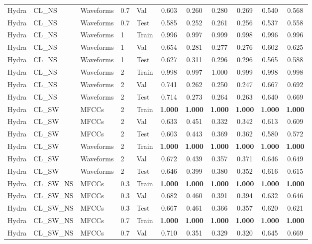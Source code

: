 \begin{landscape}
\begin{longtable}{|l|l|l|l|l|c|c|c|c|c|c|}
Hydra & CL\_NS & Waveforms & 0.7 & Val & 0.603 & 0.260 & 0.280 & 0.269 & 0.540 & 0.568 \\
Hydra & CL\_NS & Waveforms & 0.7 & Test & 0.585 & 0.252 & 0.261 & 0.256 & 0.537 & 0.558 \\
Hydra & CL\_NS & Waveforms & 1 & Train & 0.996 & 0.997 & 0.999 & 0.998 & 0.996 & 0.996 \\
Hydra & CL\_NS & Waveforms & 1 & Val & 0.654 & 0.281 & 0.277 & 0.276 & 0.602 & 0.625 \\
Hydra & CL\_NS & Waveforms & 1 & Test & 0.627 & 0.311 & 0.296 & 0.296 & 0.565 & 0.588 \\
Hydra & CL\_NS & Waveforms & 2 & Train & 0.998 & 0.997 & 1.000 & 0.999 & 0.998 & 0.998 \\
Hydra & CL\_NS & Waveforms & 2 & Val & 0.741 & 0.262 & 0.250 & 0.247 & 0.667 & 0.692 \\
Hydra & CL\_NS & Waveforms & 2 & Test & 0.714 & 0.273 & 0.264 & 0.263 & 0.640 & 0.669 \\
Hydra & CL\_SW & MFCCs & 2 & Train & \textbf{1.000} & \textbf{1.000} & \textbf{1.000} & \textbf{1.000} & \textbf{1.000} & \textbf{1.000} \\
Hydra & CL\_SW & MFCCs & 2 & Val & 0.633 & 0.451 & 0.332 & 0.342 & 0.613 & 0.609 \\
Hydra & CL\_SW & MFCCs & 2 & Test & 0.603 & 0.443 & 0.369 & 0.362 & 0.580 & 0.572 \\
Hydra & CL\_SW & Waveforms & 2 & Train & \textbf{1.000} & \textbf{1.000} & \textbf{1.000} & \textbf{1.000} & \textbf{1.000} & \textbf{1.000} \\
Hydra & CL\_SW & Waveforms & 2 & Val & 0.672 & 0.439 & 0.357 & 0.371 & 0.646 & 0.649 \\
Hydra & CL\_SW & Waveforms & 2 & Test & 0.646 & 0.399 & 0.380 & 0.352 & 0.616 & 0.615 \\
Hydra & CL\_SW\_NS & MFCCs & 0.3 & Train & \textbf{1.000} & \textbf{1.000} & \textbf{1.000} & \textbf{1.000} & \textbf{1.000} & \textbf{1.000} \\
Hydra & CL\_SW\_NS & MFCCs & 0.3 & Val & 0.682 & 0.460 & 0.391 & 0.394 & 0.632 & 0.646 \\
Hydra & CL\_SW\_NS & MFCCs & 0.3 & Test & 0.667 & 0.461 & 0.366 & 0.357 & 0.620 & 0.621 \\
Hydra & CL\_SW\_NS & MFCCs & 0.7 & Train & \textbf{1.000} & \textbf{1.000} & \textbf{1.000} & \textbf{1.000} & \textbf{1.000} & \textbf{1.000} \\
Hydra & CL\_SW\_NS & MFCCs & 0.7 & Val & 0.710 & 0.351 & 0.329 & 0.320 & 0.645 & 0.669 \\

\end{longtable}
\end{landscape}
